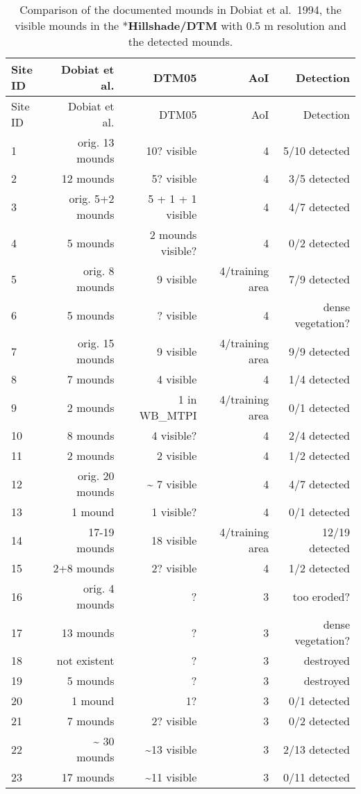 \documentclass[
  12pt,
]{article}
\begin{document}
\begin{longtable}[]{@{}lrrrr@{}}
\caption{Comparison of the documented mounds in Dobiat et al.~1994, the visible mounds in the *\textbf{Hillshade/DTM} with 0.5 m resolution and the detected mounds.}\tabularnewline
\toprule
Site ID & Dobiat et al. & DTM05 & AoI & Detection \\
\midrule
\endfirsthead
\toprule
Site ID & Dobiat et al. & DTM05 & AoI & Detection \\
\midrule
\endhead
1 & orig. 13 mounds & 10? visible & 4 & 5/10 detected \\
2 & 12 mounds & 5? visible & 4 & 3/5 detected \\
3 & orig. 5+2 mounds & 5 + 1 + 1 visible & 4 & 4/7 detected \\
4 & 5 mounds & 2 mounds visible? & 4 & 0/2 detected \\
5 & orig. 8 mounds & 9 visible & 4/training area & 7/9 detected \\
6 & 5 mounds & ? visible & 4 & dense vegetation? \\
7 & orig. 15 mounds & 9 visible & 4/training area & 9/9 detected \\
8 & 7 mounds & 4 visible & 4 & 1/4 detected \\
9 & 2 mounds & 1 in WB\_MTPI & 4/training area & 0/1 detected \\
10 & 8 mounds & 4 visible? & 4 & 2/4 detected \\
11 & 2 mounds & 2 visible & 4 & 1/2 detected \\
12 & orig. 20 mounds & \textasciitilde{} 7 visible & 4 & 4/7 detected \\
13 & 1 mound & 1 visible? & 4 & 0/1 detected \\
14 & 17-19 mounds & 18 visible & 4/training area & 12/19 detected \\
15 & 2+8 mounds & 2? visible & 4 & 1/2 detected \\
16 & orig. 4 mounds & ? & 3 & too eroded? \\
17 & 13 mounds & ? & 3 & dense vegetation? \\
18 & not existent & ? & 3 & destroyed \\
19 & 5 mounds & ? & 3 & destroyed \\
20 & 1 mound & 1? & 3 & 0/1 detected \\
21 & 7 mounds & 2? visible & 3 & 0/2 detected \\
22 & \textasciitilde{} 30 mounds & \textasciitilde13 visible & 3 & 2/13 detected \\
23 & 17 mounds & \textasciitilde11 visible & 3 & 0/11 detected \\

\end{longtable}
\end{document}
